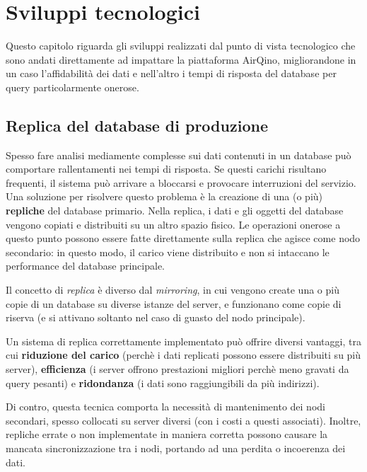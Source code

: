 \chapter{Sviluppi tecnologici}\label{ch:sviluppi}
Questo capitolo riguarda gli sviluppi realizzati dal punto di vista tecnologico che sono andati direttamente ad impattare la piattaforma AirQino, migliorandone in un caso l'affidabilità dei dati e nell'altro i tempi di risposta del database per query particolarmente onerose.

\section{Replica del database di produzione}\label{sec:replica}

Spesso fare analisi mediamente complesse sui dati contenuti in un database può comportare rallentamenti nei tempi di risposta. Se questi carichi risultano frequenti, il sistema può arrivare a bloccarsi e provocare interruzioni del servizio. Una soluzione per risolvere questo problema è la creazione di una (o più) \textbf{repliche} del database primario. Nella replica, i dati e gli oggetti del database vengono copiati e distribuiti su un altro spazio fisico. Le operazioni onerose a questo punto possono essere fatte direttamente sulla replica che agisce come nodo secondario: in questo modo, il carico viene distribuito e non si intaccano le performance del database principale.

Il concetto di \textit{replica} è diverso dal \textit{mirroring}, in cui vengono create una o più copie di un database su diverse istanze del server, e funzionano come copie di riserva (e si attivano soltanto nel caso di guasto del nodo principale).

Un sistema di replica correttamente implementato può offrire diversi vantaggi, tra cui \textbf{riduzione del carico} (perchè i dati replicati possono essere distribuiti su più server), \textbf{efficienza} (i server offrono prestazioni migliori perchè meno gravati da query pesanti) e \textbf{ridondanza} (i dati sono raggiungibili da più indirizzi).

Di contro, questa tecnica comporta la necessità di mantenimento dei nodi secondari, spesso collocati su server diversi (con i costi a questi associati). Inoltre, repliche errate o non implementate in maniera corretta possono causare la mancata sincronizzazione tra i nodi, portando ad una perdita o incoerenza dei dati.

